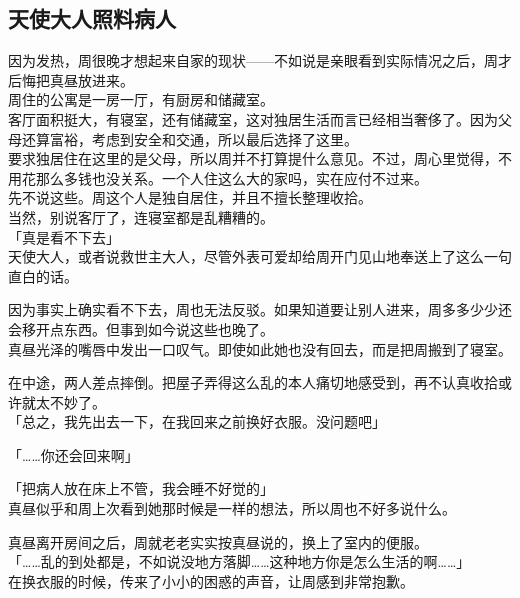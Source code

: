 \subsection{天使大人照料病人}

因为发热，周很晚才想起来自家的现状——不如说是亲眼看到实际情况之后，周才后悔把真昼放进来。\\

周住的公寓是一房一厅，有厨房和储藏室。\\

客厅面积挺大，有寝室，还有储藏室，这对独居生活而言已经相当奢侈了。因为父母还算富裕，考虑到安全和交通，所以最后选择了这里。\\

要求独居住在这里的是父母，所以周并不打算提什么意见。不过，周心里觉得，不用花那么多钱也没关系。一个人住这么大的家吗，实在应付不过来。\\

先不说这些。周这个人是独自居住，并且不擅长整理收拾。\\

当然，别说客厅了，连寝室都是乱糟糟的。\\

「真是看不下去」\\

天使大人，或者说救世主大人，尽管外表可爱却给周开门见山地奉送上了这么一句直白的话。

因为事实上确实看不下去，周也无法反驳。如果知道要让别人进来，周多多少少还会移开点东西。但事到如今说这些也晚了。\\

真昼光泽的嘴唇中发出一口叹气。即使如此她也没有回去，而是把周搬到了寝室。

在中途，两人差点摔倒。把屋子弄得这么乱的本人痛切地感受到，再不认真收拾或许就太不妙了。\\

「总之，我先出去一下，在我回来之前换好衣服。没问题吧」

「……你还会回来啊」

「把病人放在床上不管，我会睡不好觉的」\\

真昼似乎和周上次看到她那时候是一样的想法，所以周也不好多说什么。

真昼离开房间之后，周就老老实实按真昼说的，换上了室内的便服。\\

「……乱的到处都是，不如说没地方落脚……这种地方你是怎么生活的啊……」\\

在换衣服的时候，传来了小小的困惑的声音，让周感到非常抱歉。\\

